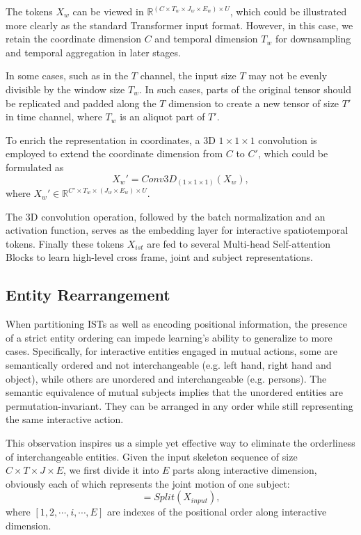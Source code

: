 \documentclass[letterpaper, 10 pt, conference]{ieeeconf}
\begin{document}
The tokens $X_{w}$ can be viewed in $\mathbb{R}^{(C\times  T_{w}\times J_{w}\times E_{w})\times U}$, which could be illustrated more clearly as the standard Transformer input format. However, in this case, we retain the coordinate dimension $C$ and temporal dimension $T_{w}$ for downsampling and temporal aggregation in later stages.

In some cases, such as in the $T$ channel, the input size $T$ may not be evenly divisible by the window size $T_w$. In such cases, parts of the original tensor should be replicated and padded along the $T$ dimension to create a new tensor of size $T'$ in time channel, where $T_w$ is an aliquot part of $T'$.

To enrich the representation in coordinates, a 3D $1\times 1 \times 1$ convolution is employed to extend the coordinate dimension from $C$ to $C'$, which could be formulated as
\begin{equation}
    X_{w}' = Conv3D_{(1\times 1 \times 1)}(X_{w}),
\end{equation}
where $X_{w}' \in \mathbb{R}^{C'\times T_{w}\times (J_{w}\times E_{w})\times U}$.

The 3D convolution operation, followed by the batch normalization and an activation function, serves as the embedding layer for interactive spatiotemporal tokens. Finally these tokens $X_{ist}$ are fed to several Multi-head Self-attention Blocks to learn high-level cross frame, joint and subject representations.

\subsection{Entity Rearrangement}
When partitioning ISTs as well as encoding positional information, the presence of a strict entity ordering can impede learning's ability to generalize to more cases. Specifically, for interactive entities engaged in mutual actions, some are semantically ordered and not interchangeable (e.g. left hand, right hand and object), while others are unordered and interchangeable (e.g. persons). The semantic equivalence of mutual subjects implies that the unordered entities are permutation-invariant. They can be arranged in any order while still representing the same interactive action.

This observation inspires us a simple yet effective way to eliminate the orderliness of interchangeable entities. Given the input skeleton sequence of size $C\times T\times J \times E$, we first divide it into $E$ parts along interactive dimension, obviously each of which represents the joint motion of one subject:
\begin{equation}
    [X_{1}, X_{2},\cdots, X_{i},\cdots, X_{E}] = Split(X_{input}),
\end{equation}
where $[1, 2,\cdots, i,\cdots, E]$ are indexes of the positional order along interactive dimension.
\end{document}
